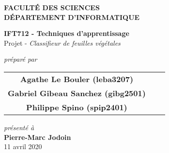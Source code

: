 \documentclass[letterpaper, 12pt]{article}
\begin{document}
    \begin{titlepage}
        \begin{center}
            \begin{large}
                \textbf{FACULTÉ DES SCIENCES} \\
                \textbf{DÉPARTEMENT D'INFORMATIQUE}
            \end{large}
            \vfill
            \begin{Large}
                \textbf{IFT712 - Techniques d'apprentissage} \\
                Projet - \textit{Classifieur de feuilles végétales}
            \end{Large}
            \vfill
            \textit{préparé par} \\
            \begin{tabular}{ccc}
                \textbf{Agathe Le Bouler (leba3207)} \\
                \textbf{Gabriel Gibeau Sanchez (gibg2501)} \\
                \textbf{Philippe Spino (spip2401)}
            \end{tabular}
            \vfill
            \textit{présenté à} \\
            \textbf{Pierre-Marc Jodoin} \\
            \vfill
            11 avril 2020
        \end{center}
    \end{titlepage}
    \pagebreak
    
    
    \tableofcontents
    \pagebreak
    
%    
%    
    
    
    
    \newpage
    
    \newpage
    
    \newpage
    
    \newpage
    
    
    \pagebreak
        
    \pagebreak
    
    \singlespacing
    \renewcommand{\refname}{Bibliographie}
    
    
\end{document}

